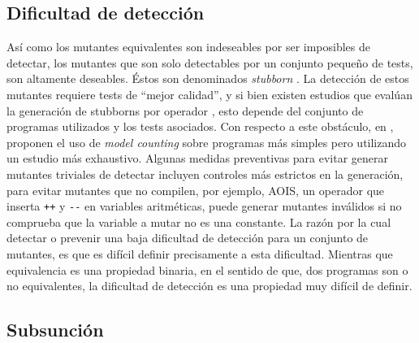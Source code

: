 \subsection{Dificultad de detecci\'on}

As\'i como los mutantes equivalentes son indeseables por ser imposibles de detectar, los mutantes que son solo detectables por un conjunto peque\~no de tests, son altamente deseables. \'Estos son denominados \emph{stubborn} \cite{bibliography.mutation.evaluation.stubbornHieronsHD99}. La detecci\'on de estos mutantes requiere tests de ``mejor calidad'', y si bien existen estudios que eval\'uan la generaci\'on de stubborns por operador \cite{bibliography.mutation.evaluation.stubborn}, esto depende del conjunto de programas utilizados y los tests asociados. Con respecto a este obst\'aculo, en \cite{bibliography.mutation.evaluation.hardnessVisser}, proponen el uso de \emph{model counting} sobre programas m\'as simples pero utilizando un estudio m\'as exhaustivo. Algunas medidas preventivas para evitar generar mutantes triviales de detectar incluyen controles m\'as estrictos en la generaci\'on, para evitar mutantes que no compilen, por ejemplo, AOIS, un operador que inserta \lstinline|++| y \lstinline|--| en variables aritm\'eticas, puede generar mutantes inv\'alidos si no comprueba que la variable a mutar no es una constante. La raz\'on por la cual detectar o prevenir una baja dificultad de detecci\'on para un conjunto de mutantes, es que es dif\'icil definir precisamente a esta dificultad. Mientras que equivalencia es una propiedad binaria, en el sentido de que, dos programas son o no equivalentes, la dificultad de detecci\'on es una propiedad muy dif\'icil de definir. 

\subsection{Subsunci\'on}

